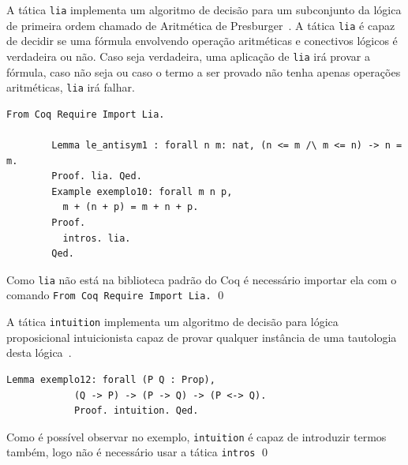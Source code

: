 			\begin{exemplo}
				A tática \texttt{lia} implementa um algoritmo de decisão para um subconjunto da lógica de primeira ordem chamado de Aritmética
				de Presburger~\cite{pierce2021software}. A tática \texttt{lia} é capaz de decidir se uma fórmula envolvendo operação aritméticas e conectivos lógicos
				é verdadeira ou não. Caso seja verdadeira, uma aplicação de \texttt{lia} irá provar a fórmula, caso não seja ou caso o termo a ser provado não tenha
				apenas operações aritméticas, \texttt{lia} irá falhar.
				\begin{lstlisting}[language=coq]
		From Coq Require Import Lia.

		Lemma le_antisym1 : forall n m: nat, (n <= m /\ m <= n) -> n = m.
		Proof. lia. Qed.
		Example exemplo10: forall m n p,
		  m + (n + p) = m + n + p.
		Proof.
		  intros. lia.
		Qed.
				\end{lstlisting}
				Como \texttt{lia} não está na biblioteca padrão do Coq é necessário importar ela com o comando \texttt{From Coq Require Import Lia.} \qed
			\end{exemplo}

			\begin{exemplo}
				A tática \texttt{intuition} implementa um algoritmo de decisão para lógica proposicional intuicionista capaz de provar qualquer
				instância de uma tautologia desta lógica~\cite{coqteam2022manual}.
				\begin{lstlisting}[language=coq]
			Lemma exemplo12: forall (P Q : Prop),
			(Q -> P) -> (P -> Q) -> (P <-> Q).
			Proof. intuition. Qed.
				\end{lstlisting}
				Como é possível observar no exemplo, \texttt{intuition} é capaz de introduzir termos também, logo não é necessário usar a tática \texttt{intros} \qed
			\end{exemplo}

